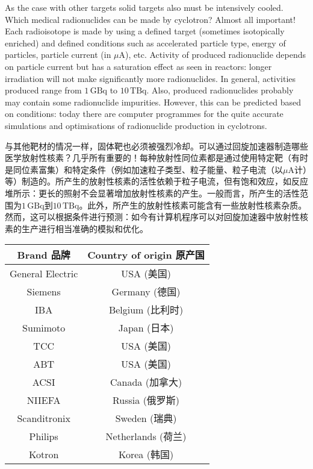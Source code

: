 \documentclass[dvipsnames, svgnames,a4paper,11pt]{article}
\begin{document}
As the case with other targets solid targets also must be intensively cooled. Which medical radionuclides can be made by cyclotron? Almost all important! Each radioisotope is made by using a defined target (sometimes isotopically enriched) and defined conditions such as accelerated particle type, energy of particles, particle current (in $\mu\text{A}$), etc. Activity of produced radionuclide depends on particle current but has a saturation effect as seen in reactors: longer irradiation will not make significantly more radionuclides. In general, activities produced range from $1\, \text{GBq}$ to $10\, \text{TBq}$. Also, produced radionuclides probably may contain some radionuclide impurities. However, this can be predicted based on conditions: today there are computer programmes for the quite accurate simulations and optimisations of radionuclide production in cyclotrons.

与其他靶材的情况一样，固体靶也必须被强烈冷却。可以通过回旋加速器制造哪些医学放射性核素？几乎所有重要的！每种放射性同位素都是通过使用特定靶（有时是同位素富集）和特定条件（例如加速粒子类型、粒子能量、粒子电流（以$\mu\text{A}$计）等）制造的。所产生的放射性核素的活性依赖于粒子电流，但有饱和效应，如反应堆所示：更长的照射不会显著增加放射性核素的产生。一般而言，所产生的活性范围为$1\, \text{GBq}$到$10\, \text{TBq}$。此外，所产生的放射性核素可能含有一些放射性核素杂质。然而，这可以根据条件进行预测：如今有计算机程序可以对回旋加速器中放射性核素的生产进行相当准确的模拟和优化。

\begin{table}[h]
      \centering
      \label{table3}
      \begin{tabular}{cc}
      \toprule
      \textbf{Brand 品牌} & \textbf{Country of origin 原产国} \\
      \midrule
      General Electric & USA (美国) \\
      Siemens & Germany (德国) \\
      IBA & Belgium (比利时) \\
      Sumimoto & Japan (日本) \\
      TCC & USA (美国) \\
      ABT & USA (美国) \\
      ACSI & Canada (加拿大) \\
      NIIEFA & Russia (俄罗斯) \\
      Scanditronix & Sweden (瑞典) \\
      Philips & Netherlands (荷兰) \\
      Kotron & Korea (韩国) \\
      \bottomrule
      \end{tabular}
      \end{table}
\end{document}
